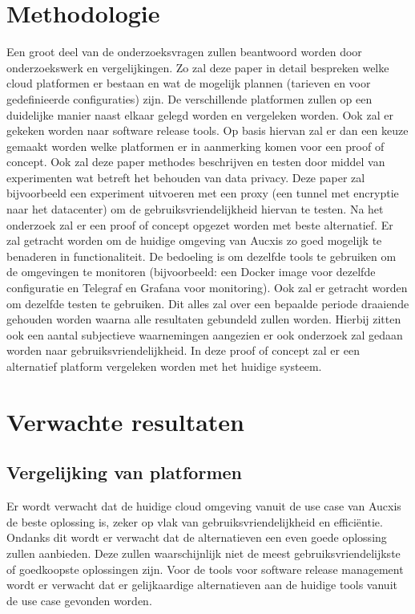 \section{Methodologie}
\label{sec:methodologie}
Een groot deel van de onderzoeksvragen zullen beantwoord worden door onderzoekswerk en vergelijkingen. Zo zal deze paper in detail bespreken welke cloud platformen er bestaan en wat de mogelijk plannen (tarieven en voor gedefinieerde configuraties) zijn. De verschillende platformen zullen op een duidelijke manier naast elkaar gelegd worden en vergeleken worden. Ook zal er gekeken worden naar software release tools. Op basis hiervan zal er dan een keuze gemaakt worden welke platformen er in aanmerking komen voor een proof of concept.
\newline
\newline
Ook zal deze paper methodes beschrijven en testen door middel van experimenten wat betreft het behouden van data privacy. Deze paper zal bijvoorbeeld een experiment uitvoeren met een proxy (een tunnel met encryptie naar het datacenter) om de gebruiksvriendelijkheid hiervan te testen.
\newline
\newline
Na het onderzoek zal er een proof of concept opgezet worden met beste alternatief. Er zal getracht worden om de huidige omgeving van Aucxis zo goed mogelijk te benaderen in functionaliteit. De bedoeling is om dezelfde tools te gebruiken om de omgevingen te monitoren (bijvoorbeeld: een Docker image voor dezelfde configuratie en Telegraf en Grafana voor monitoring). Ook zal er getracht worden om dezelfde testen te gebruiken. Dit alles zal over een bepaalde periode draaiende gehouden worden waarna alle resultaten gebundeld zullen worden. Hierbij zitten ook een aantal subjectieve waarnemingen aangezien er ook onderzoek zal gedaan worden naar gebruiksvriendelijkheid. In deze proof of concept zal er een alternatief platform vergeleken worden met het huidige systeem.
\newline
\newline
\newline
\newline

\section{Verwachte resultaten}
\label{sec:verwachte_resultaten}
\subsection{Vergelijking van platformen}
Er wordt verwacht dat de huidige cloud omgeving vanuit de use case van Aucxis de beste oplossing is, zeker op vlak van gebruiksvriendelijkheid en efficiëntie. Ondanks dit wordt er verwacht dat de alternatieven een even goede oplossing zullen aanbieden. Deze zullen waarschijnlijk niet de meest gebruiksvriendelijkste of goedkoopste oplossingen zijn. Voor de tools voor software release management wordt er verwacht dat er gelijkaardige alternatieven aan de huidige tools vanuit de use case gevonden worden.

